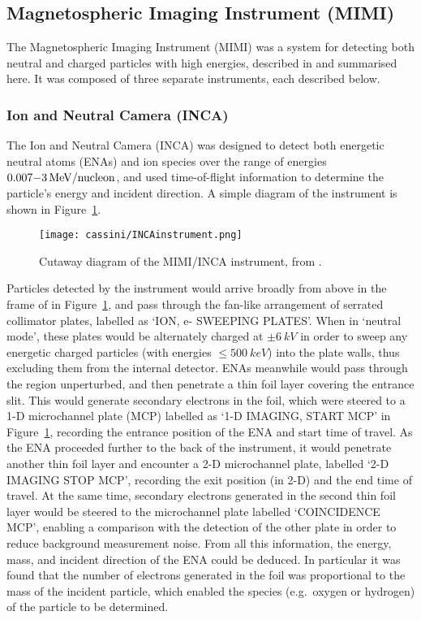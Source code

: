 \subsection{Magnetospheric Imaging Instrument (MIMI)}
The Magnetospheric Imaging Instrument (MIMI) was a system for detecting both neutral and charged particles with high energies, described in \citet{krimigis2004} and summarised here. It was composed of three separate instruments, each described below.
\subsubsection{Ion and Neutral Camera (INCA)}
The Ion and Neutral Camera (INCA) was designed to detect both energetic neutral atoms (ENAs) and ion species over the range of energies $0.007{\--}\SI{3}{MeV/nucleon}$, and used time-of-flight information to determine the particle's energy and incident direction. A simple diagram of the instrument is shown in Figure~\ref{cassini:fig:INCAinstrument}.

\begin{figure}
\centering
\noindent\texttt{[image: cassini/INCAinstrument.png]}
\caption[Diagram of the MIMI/INCA instrument.]{Cutaway diagram of the MIMI/INCA instrument, from \citet{krimigis2004}.}
\label{cassini:fig:INCAinstrument}
\end{figure}

Particles detected by the instrument would arrive broadly from above in the frame of in Figure~\ref{cassini:fig:INCAinstrument}, and pass through the fan-like arrangement of serrated collimator plates, labelled as `ION, e- SWEEPING PLATES'. When in `neutral mode', these plates would be alternately charged at $\pm\SI{6}{kV}$ in order to sweep any energetic charged particles (with energies $\leq \SI{500}{keV}$) into the plate walls, thus excluding them from the internal detector. ENAs meanwhile would pass through the region unperturbed, and then penetrate a thin foil layer covering the entrance slit. This would generate secondary electrons in the foil, which were steered to a 1-D microchannel plate (MCP) labelled as `1-D IMAGING, START MCP' in Figure~\ref{cassini:fig:INCAinstrument}, recording the entrance position of the ENA and start time of travel. As the ENA proceeded further to the back of the instrument, it would penetrate another thin foil layer and encounter a 2-D microchannel plate, labelled `2-D IMAGING STOP MCP', recording the exit position (in 2-D) and the end time of travel. At the same time, secondary electrons generated in the second thin foil layer would be steered to the microchannel plate labelled `COINCIDENCE MCP', enabling a comparison with the detection of the other plate in order to reduce background measurement noise. From all this information, the energy, mass, and incident direction of the ENA could be deduced. In particular it was found that the number of electrons generated in the foil was proportional to the mass of the incident particle, which enabled the species (e.g.\ oxygen or hydrogen) of the particle to be determined. 


